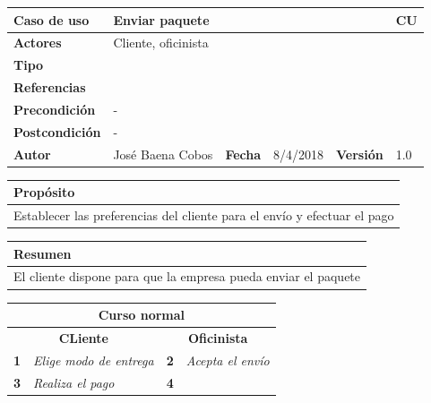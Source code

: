 \documentclass[12pt,spanish]{article}
\begin{document}
\begin{table}[H]
	\centering
	\begin{tabular}{|m{3cm}|m{4cm}|m{2cm}|m{2cm}|m{2cm}|m{1cm}|}
		\hline
		\textbf{Caso de uso} &  \multicolumn{4}{m{11cm}|}{Enviar paquete} \vline &  \cellcolor{gray!40}CU\arabic{contadorCU}  \stepcounter{contadorCU} \\
		\hline
		\textbf{Actores} & \multicolumn{5}{m{11cm}|}{Cliente, oficinista} \\
		\hline
		\textbf{Tipo} & \multicolumn{5}{m{11cm}|}{} \\
		\hline
		\textbf{Referencias} &\multicolumn{5}{m{11cm}|}{} \\
		\hline
		\textbf{Precondición} & \multicolumn{5}{m{11cm}|}{-} \\
		\hline
		\textbf{Postcondición} & \multicolumn{5}{m{11cm}|}{-} \\
		\hline
		\textbf{Autor} & José Baena Cobos & \textbf{Fecha} & 8/4/2018 & \textbf{Versión} & 1.0 \\
		\hline
	\end{tabular}
	
	\vspace{1cm}
	
	\begin{tabular}{|m{16.2cm}|}
		\hline
		\textbf{Propósito} \\
		\hline
		Establecer las preferencias del cliente para el envío y efectuar el pago\\
		\hline
	\end{tabular}
	
	\vspace{1cm}
	
	\begin{tabular}{|m{16.2cm}|}
		\hline
		\textbf{Resumen} \\
		\hline
		El cliente dispone para que la empresa pueda enviar el paquete\\
		\hline
	\end{tabular}
	
	\vspace{1cm}
	
	\begin{tabular}{|m{5pt}|m{7.33cm}|m{5pt}|m{7.33cm}|}
		\hline
		\multicolumn{4}{|c|}{\textbf{Curso normal}} \\
		\hline
		\multicolumn{2}{|c}{\textbf{CLiente}} & \multicolumn{2}{|c|}{\textbf{Oficinista}} \\
		\hline
		\textbf{1} & \textit{Elige modo de entrega} & \textbf{2} & \textit{Acepta el envío} \\
		\hline
		\textbf{3} & \textit{Realiza el pago} & \textbf{4} & \textit{} \\
		\hline
	

\end{tabular}
\end{table}
\end{document}
